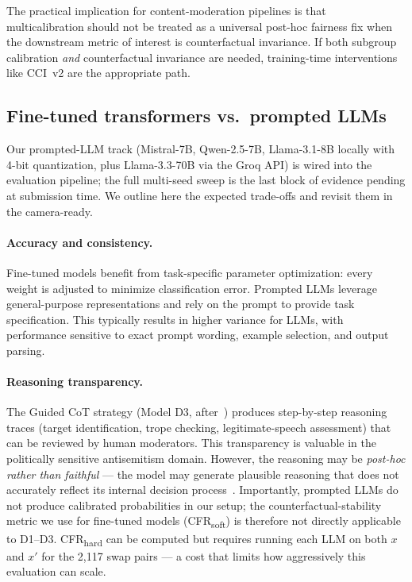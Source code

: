 \documentclass[10pt,a4paper]{article}
\begin{document}
The practical implication for content-moderation pipelines is that multicalibration should not be treated as a universal post-hoc fairness fix when the downstream metric of interest is counterfactual invariance. If both subgroup calibration \emph{and} counterfactual invariance are needed, training-time interventions like CCI~v2 are the appropriate path.

\subsection{Fine-tuned transformers vs.\ prompted LLMs}

Our prompted-LLM track (Mistral-7B, Qwen-2.5-7B, Llama-3.1-8B locally with 4-bit quantization, plus Llama-3.3-70B via the Groq API) is wired into the evaluation pipeline; the full multi-seed sweep is the last block of evidence pending at submission time. We outline here the expected trade-offs and revisit them in the camera-ready.

\paragraph{Accuracy and consistency.}
Fine-tuned models benefit from task-specific parameter optimization: every weight is adjusted to minimize classification error. Prompted LLMs leverage general-purpose representations and rely on the prompt to provide task specification. This typically results in higher variance for LLMs, with performance sensitive to exact prompt wording, example selection, and output parsing.

\paragraph{Reasoning transparency.}
The Guided CoT strategy (Model D3, after~\citet{patel2025evaluating}) produces step-by-step reasoning traces (target identification, trope checking, legitimate-speech assessment) that can be reviewed by human moderators. This transparency is valuable in the politically sensitive antisemitism domain. However, the reasoning may be \emph{post-hoc rather than faithful} --- the model may generate plausible reasoning that does not accurately reflect its internal decision process~\citep{turpin2023language}. Importantly, prompted LLMs do not produce calibrated probabilities in our setup; the counterfactual-stability metric we use for fine-tuned models (CFR\textsubscript{soft}) is therefore not directly applicable to D1--D3. CFR\textsubscript{hard} can be computed but requires running each LLM on both $x$ and $x'$ for the 2{,}117 swap pairs --- a cost that limits how aggressively this evaluation can scale.
\end{document}
